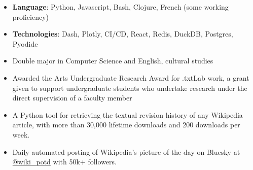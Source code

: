 \begin{itemize}
\item \textbf{Language}: Python, Javascript, Bash, Clojure, French (some working proficiency)
\item \textbf{Technologies}: Dash, Plotly, CI/CD, React, Redis, DuckDB, Postgres, Pyodide
\end{itemize}

\begin{itemize}
\item Double major in Computer Science and English, cultural studies
\item Awarded the Arts Undergraduate Research Award for .txtLab work, a grant given to support undergraduate students who undertake research under the direct supervision of a faculty member
\end{itemize}

\begin{itemize}
\item A Python tool for retrieving the textual revision history of any Wikipedia article, with more than 30,000 lifetime downloads and 200 downloads per week.
\end{itemize}
\begin{itemize}
\item Daily automated posting of Wikipedia's picture of the day on Bluesky at \href{https://bsky.app/profile/wiki-potd.bsky.social}{@wiki\_potd} with 50k+ followers.
\end{itemize}

